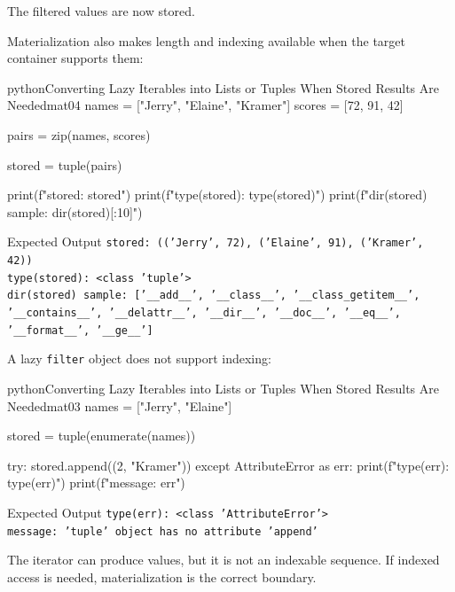 \documentclass[a4paper,twoside]{report}
\begin{document}
The filtered values are now stored.

Materialization also makes length and indexing available when the target container supports them:

\begin{codebox}[]{python}{Converting Lazy Iterables into Lists or Tuples When Stored Results Are Needed}{mat04}
names = ["Jerry", "Elaine", "Kramer"]
scores = [72, 91, 42]

pairs = zip(names, scores)

stored = tuple(pairs)

print(f"stored: {stored}")
print(f"type(stored): {type(stored)}")
print(f"dir(stored) sample: {dir(stored)[:10]}")
\end{codebox}


\begin{iobox}{Expected Output}
\texttt{stored: (('Jerry', 72), ('Elaine', 91), ('Kramer', 42))} \\
\texttt{type(stored): <class 'tuple'>} \\
\texttt{dir(stored) sample: ['\_\_add\_\_', '\_\_class\_\_', '\_\_class\_getitem\_\_',} \\
\texttt{'\_\_contains\_\_', '\_\_delattr\_\_', '\_\_dir\_\_', '\_\_doc\_\_', '\_\_eq\_\_',} \\
\texttt{'\_\_format\_\_', '\_\_ge\_\_']} \\
\end{iobox}




A lazy \texttt{filter} object does not support indexing:

\begin{codebox}[]{python}{Converting Lazy Iterables into Lists or Tuples When Stored Results Are Needed}{mat03}
names = ["Jerry", "Elaine"]

stored = tuple(enumerate(names))

try:
    stored.append((2, "Kramer"))
except AttributeError as err:
    print(f"type(err): {type(err)}")
    print(f"message: {err}")
\end{codebox}


\begin{iobox}{Expected Output}
\texttt{type(err): <class 'AttributeError'>} \\
\texttt{message: 'tuple' object has no attribute 'append'} \\
\end{iobox}




The iterator can produce values, but it is not an indexable sequence. If indexed access is needed, materialization is the correct boundary.
\end{document}
